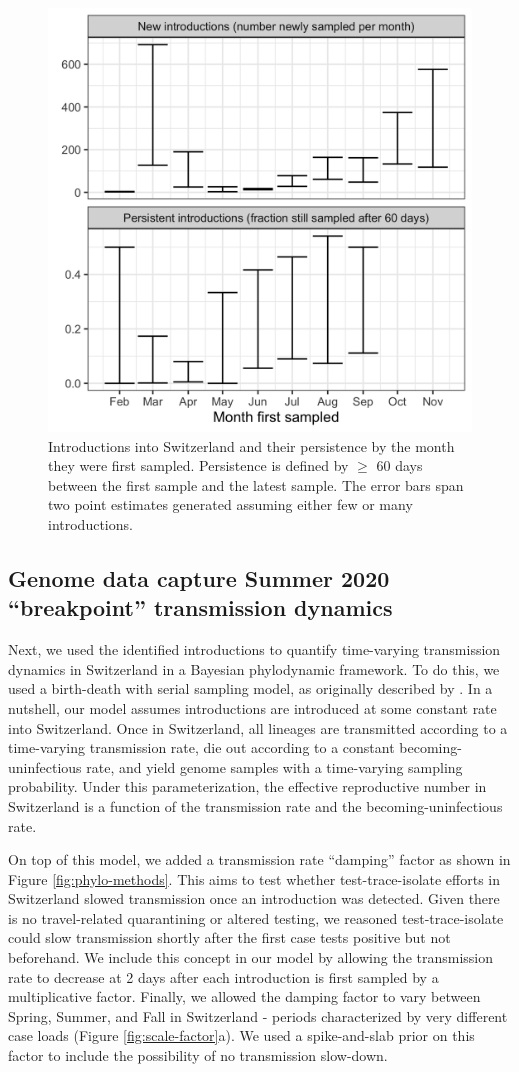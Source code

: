 \documentclass[9pt,twoside,lineno]{pnas-new} %
\begin{document}
\begin{figure}[H]
\centering
\includegraphics[width=.4\linewidth]{figures/introductions_and_persistance.png}
\caption{Introductions into Switzerland and their persistence by the month they were first sampled. Persistence is defined by $\geq$ 60 days between the first sample and the latest sample. The error bars span two point estimates generated assuming either few or many introductions.}
\label{fig:chain-longevity}
\end{figure}

\subsection{Genome data capture Summer 2020 ``breakpoint'' transmission dynamics}

Next, we used the identified introductions to quantify time-varying transmission dynamics in Switzerland in a Bayesian phylodynamic framework. To do this, we used a birth-death with serial sampling model, as originally described by \cite{stadler_2010_bds}. In a nutshell, our model assumes introductions are introduced at some constant rate into Switzerland. Once in Switzerland, all lineages are transmitted according to a time-varying transmission rate, die out according to a constant becoming-uninfectious rate, and yield genome samples with a time-varying sampling probability. Under this parameterization, the effective reproductive number in Switzerland is a function of the transmission rate and the becoming-uninfectious rate.

On top of this model, we added a transmission rate ``damping'' factor as shown in Figure \ref{fig:phylo-methods}. This aims to test whether test-trace-isolate efforts in Switzerland slowed transmission once an introduction was detected. Given there is no travel-related quarantining or altered testing, we reasoned test-trace-isolate could slow transmission shortly after the first case tests positive but not beforehand. We include this concept in our model by allowing the transmission rate to decrease at 2 days after each introduction is first sampled by a multiplicative factor. Finally, we allowed the damping factor to vary between Spring, Summer, and Fall in Switzerland - periods characterized by very different case loads (Figure \ref{fig:scale-factor}a). We used a spike-and-slab prior on this factor to include the possibility of no transmission slow-down. 
\end{document}
